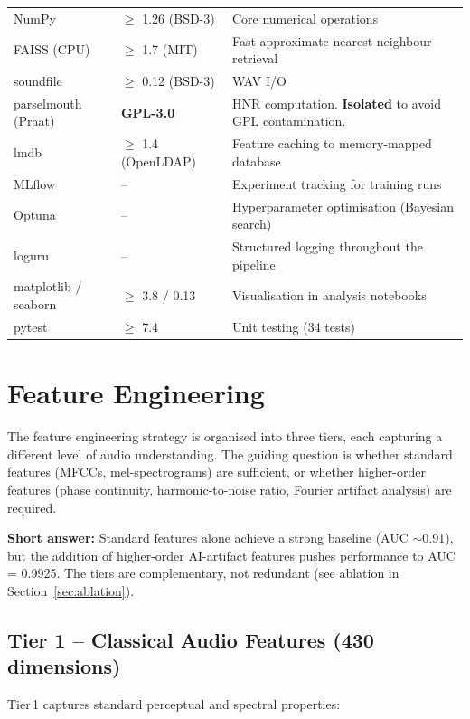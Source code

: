\documentclass[11pt,a4paper]{article}
\begin{document}
\begin{longtable}{p{4.2cm} p{3.5cm} p{6.5cm}}
NumPy & $\geq$ 1.26 (BSD-3) & Core numerical operations \\
FAISS (CPU) & $\geq$ 1.7 (MIT) & Fast approximate nearest-neighbour retrieval \\
soundfile & $\geq$ 0.12 (BSD-3) & WAV I/O \\
parselmouth (Praat) & \textbf{GPL-3.0} & HNR computation. \textbf{Isolated} to avoid GPL contamination. \\
lmdb & $\geq$ 1.4 (OpenLDAP) & Feature caching to memory-mapped database \\
MLflow & -- & Experiment tracking for training runs \\
Optuna & -- & Hyperparameter optimisation (Bayesian search) \\
loguru & -- & Structured logging throughout the pipeline \\
matplotlib / seaborn & $\geq$ 3.8 / 0.13 & Visualisation in analysis notebooks \\
pytest & $\geq$ 7.4 & Unit testing (34 tests) \\
\bottomrule
\end{longtable}


\section{Feature Engineering}
\label{sec:features}

The feature engineering strategy is organised into three tiers, each capturing a different level of audio understanding. The guiding question is whether standard features (MFCCs, mel-spectrograms) are sufficient, or whether higher-order features (phase continuity, harmonic-to-noise ratio, Fourier artifact analysis) are required.

\textbf{Short answer:} Standard features alone achieve a strong baseline (AUC $\sim$0.91), but the addition of higher-order AI-artifact features pushes performance to AUC = 0.9925. The tiers are complementary, not redundant (see ablation in Section~\ref{sec:ablation}).

\subsection{Tier 1 -- Classical Audio Features (430 dimensions)}

Tier\,1 captures standard perceptual and spectral properties:
\end{document}

